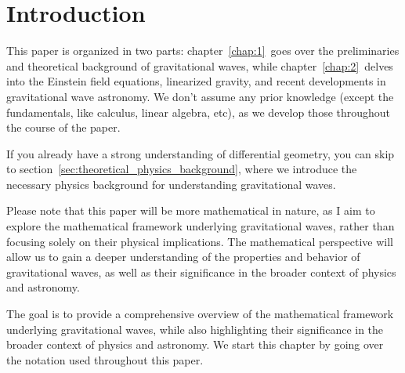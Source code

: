 \section{Introduction}
\label{sec:introduction}

\noindent
This paper is organized in two parts: chapter~\ref{chap:1}~goes over the preliminaries and theoretical background of gravitational waves, while chapter~\ref{chap:2}~delves into the Einstein field equations, linearized gravity, and recent developments in gravitational wave astronomy. We don't assume any prior knowledge (except the fundamentals, like calculus, linear algebra, etc), as we develop those throughout the course of the paper.

If you already have a strong understanding of differential geometry, you can skip to section~\ref{sec:theoretical_physics_background}, where we introduce the necessary physics background for understanding gravitational waves.

Please note that this paper will be more mathematical in nature, as I aim to explore the mathematical framework underlying gravitational waves, rather than focusing solely on their physical implications. The mathematical perspective will allow us to gain a deeper understanding of the properties and behavior of gravitational waves, as well as their significance in the broader context of physics and astronomy.

The goal is to provide a comprehensive overview of the mathematical framework underlying gravitational waves, while also highlighting their significance in the broader context of physics and astronomy. We start this chapter by going over the notation used throughout this paper.
